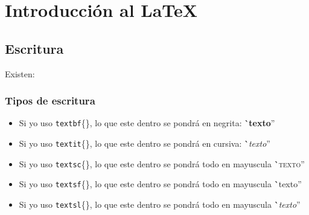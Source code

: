 \documentclass[12pt,a4paper]{book} %
\begin{document}
    \chapter{Introducción al \LaTeX}
     
        \section{Escritura}
             Existen:
         
             \subsection*{Tipos de escritura}
         
              \begin{itemize}
                \item Si yo uso \texttt{textbf}\{\}, lo
                que este dentro se pondrá en negrita:
                \``\textbf{texto}''

                \item Si yo uso \texttt{textit}\{\}, lo
                que este dentro se pondrá en cursiva:
                \``\textit{texto}''
           
                \item Si yo uso \texttt{textsc}\{\}, lo
                que este dentro se pondrá todo en mayuscula
                \``\textsc{texto}''

                \item Si yo uso \texttt{textsf}\{\}, lo
                que este dentro se pondrá todo en mayuscula
                \``\textsf{texto}''
           
                \item Si yo uso \texttt{textsl}\{\}, lo
                que este dentro se pondrá todo en mayuscula
                \``\textsl{texto}''
              \end{itemize}

\end{document}
